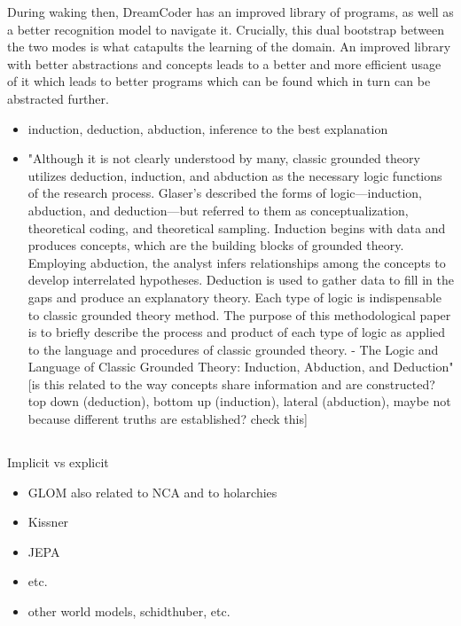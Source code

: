 During waking then, DreamCoder has an improved library of programs, as well as a better recognition model to navigate it. Crucially, this dual bootstrap between the two modes is what catapults the learning of the domain. An improved library with better abstractions and concepts leads to a better and more efficient usage of it which leads to better programs which can be found which in turn can be abstracted further. 


\begin{itemize}
    \item induction, deduction, abduction, inference to the best explanation
    \item "Although it is not clearly understood by many, classic grounded theory utilizes deduction, induction, and abduction as the necessary logic functions of the research process. Glaser’s described the forms of logic—induction, abduction, and deduction—but referred to them as conceptualization, theoretical coding, and theoretical sampling. Induction begins with data and produces concepts, which are the building blocks of grounded theory. Employing abduction, the analyst infers relationships among the concepts to develop interrelated hypotheses. Deduction is used to gather data to fill in the gaps and produce an explanatory theory. Each type of logic is indispensable to classic grounded theory method. The purpose of this methodological paper is to briefly describe the process and product of each type of logic as applied to the language and procedures of classic grounded theory. - The Logic and Language of Classic Grounded Theory: Induction, Abduction, and Deduction" [is this related to the way concepts share information and are constructed? top down (deduction), bottom up (induction), lateral (abduction), maybe not because different truths are established? check this]
\end{itemize}


\subsection{}
Implicit vs explicit
\begin{itemize}
    \item GLOM also related to NCA and to holarchies
    \item Kissner
    \item JEPA
    \item etc. 
    \item other world models, schidthuber, etc.
\end{itemize}









